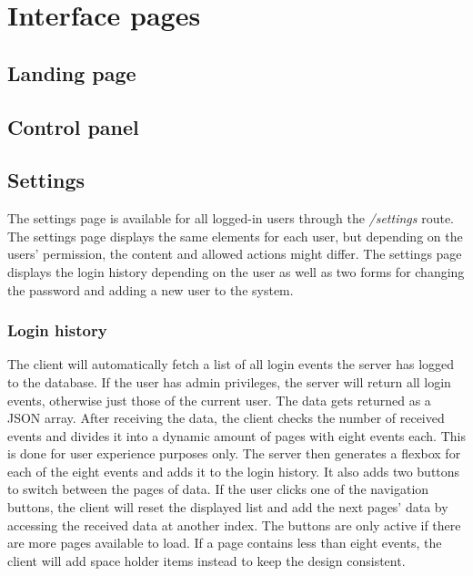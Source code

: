 \chapter{Interface pages}
\label{ch:interface_pages}


\section{Landing page}
\label{sec:landing_page}



\section{Control panel}
\label{sec:control_panel}



\section{Settings}
\label{sec:settings}
The settings page is available for all logged-in users through the \textit{/settings} route. The settings page displays the same elements for each user, but depending on the users' permission, the content and allowed actions might differ. The settings page displays the login history depending on the user as well as two forms for changing the password and adding a new user to the system.


\subsection{Login history}
\label{subsec:login_history}
The client will automatically fetch a list of all login events the server has logged to the database. If the user has admin privileges, the server will return all login events, otherwise just those of the current user. The data gets returned as a JSON array.
After receiving the data, the client checks the number of received events and divides it into a dynamic amount of pages with eight events each. This is done for user experience purposes only. The server then generates a flexbox for each of the eight events and adds it to the login history. It also adds two buttons to switch between the pages of data.
If the user clicks one of the navigation buttons, the client will reset the displayed list and add the next pages' data by accessing the received data at another index.  The buttons are only active if there are more pages available to load.
If a page contains less than eight events, the client will add space holder items instead to keep the design consistent.

